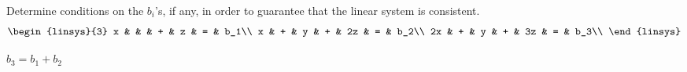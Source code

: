 
\begin{Exercise}[name={},
title={}, 
origin={\cite{OV}},
counter=Exercise]
Determine conditions on the $b_i$'s, if any, in order to guarantee that the linear system is consistent.
\[
\begin{linsys}{3}
x &   &   & + & z & = & b_1\\
x & + & y & + & 2z & = & b_2\\
2x & + & y & + & 3z & = & b_3\\
\end{linsys}
\]
\end{Exercise}

\begin{Answer}
$b_3=b_1+b_2$
\end{Answer}

